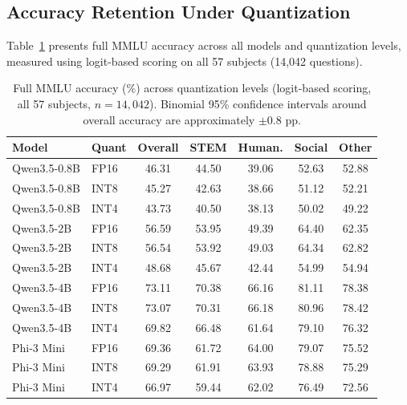 \documentclass[11pt,a4paper]{article}
\begin{document}
\subsection{Accuracy Retention Under Quantization}
\label{sec:accuracy}

Table~\ref{tab:mmlu_accuracy} presents full MMLU accuracy across all models and quantization levels, measured using logit-based scoring on all 57 subjects (14,042 questions).

\begin{table}[htbp]
\centering
\small
\caption{Full MMLU accuracy (\%) across quantization levels (logit-based scoring, all 57 subjects, $n=14{,}042$). Binomial 95\% confidence intervals around overall accuracy are approximately $\pm 0.8$ pp.}
\label{tab:mmlu_accuracy}
\begin{tabular}{l l c c c c c}
\toprule
\textbf{Model} & \textbf{Quant} & \textbf{Overall} & \textbf{STEM} & \textbf{Human.} & \textbf{Social} & \textbf{Other} \\
\midrule
Qwen3.5-0.8B & FP16 & 46.31 & 44.50 & 39.06 & 52.63 & 52.88 \\
Qwen3.5-0.8B & INT8 & 45.27 & 42.63 & 38.66 & 51.12 & 52.21 \\
Qwen3.5-0.8B & INT4 & 43.73 & 40.50 & 38.13 & 50.02 & 49.22 \\
Qwen3.5-2B & FP16 & 56.59 & 53.95 & 49.39 & 64.40 & 62.35 \\
Qwen3.5-2B & INT8 & 56.54 & 53.92 & 49.03 & 64.34 & 62.82 \\
Qwen3.5-2B & INT4 & 48.68 & 45.67 & 42.44 & 54.99 & 54.94 \\
Qwen3.5-4B & FP16 & 73.11 & 70.38 & 66.16 & 81.11 & 78.38 \\
Qwen3.5-4B & INT8 & 73.07 & 70.31 & 66.18 & 80.96 & 78.42 \\
Qwen3.5-4B & INT4 & 69.82 & 66.48 & 61.64 & 79.10 & 76.32 \\
Phi-3 Mini & FP16 & 69.36 & 61.72 & 64.00 & 79.07 & 75.52 \\
Phi-3 Mini & INT8 & 69.29 & 61.91 & 63.93 & 78.88 & 75.29 \\
Phi-3 Mini & INT4 & 66.97 & 59.44 & 62.02 & 76.49 & 72.56 \\
\bottomrule
\end{tabular}
\end{table}
\end{document}
